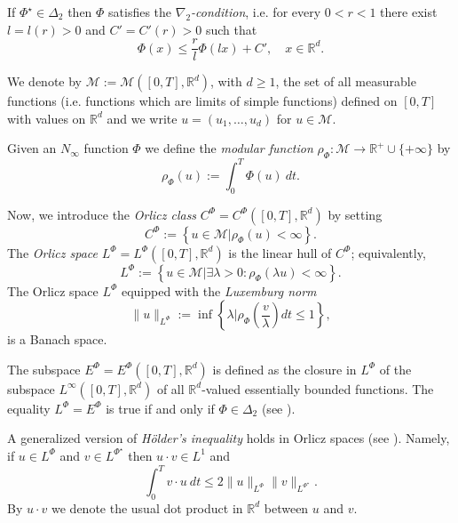 \documentclass[twoside]{article}
\theoremstyle{remark}
\newcommand{\orlnor}{\|_{L^{\Phi}}}
\newcommand{\lphi}{L^{\Phi}}
\newcommand{\lpsi}{L^{\Phi^{\star}}}
\newcommand{\ephi}{E^{\Phi}}
\newcommand{\claseor}{C^{\Phi}}
\newcommand{\rr}{\mathbb{R}}
\renewcommand{\leq}{\leqslant}
\renewcommand{\geq}{\geqslant}
\begin{document}
If $\Phi^{\star}\in\Delta_2$ then $\Phi$ satisfies the \emph{$\nabla_2$-condition}, i.e.  for every $0<r<1$ there exist $l=l(r)>0$ and $C'=C'(r)>0$ such that 
\begin{equation}\label{eq:nabla2}
  \Phi(x)\leq \frac{r}{l}\Phi(l x)+C',\quad x\in\rr^d.
\end{equation}





 We denote by $\mathcal{M}:=\mathcal{M}\left([0,T],\rr^d\right)$, with $d\geq 1$,  the set of all measurable functions (i.e. functions which are limits of simple functions)  defined on $[0,T]$ with values on $\mathbb{R}^d$ and  we write $u=(u_1,\dots,u_d)$ for  $u\in \mathcal{M}$.

 Given  an $N_{\infty}$ function $\Phi$ we define the \emph{modular function} 
$\rho_{\Phi}:\mathcal{M}\to \mathbb{R}^+\cup\{+\infty\}$ by
\[\rho_{\Phi}(u):= \int_0^T \Phi(u)\ dt.\]

Now, we introduce the \emph{Orlicz class} $C^{\Phi}=C^{\Phi}\left([0,T],\rr^d\right)$   by setting
\begin{equation}\label{claseOrlicz}
  C^{\Phi}:=\left\{u\in \mathcal{M} | \rho_{\Phi}(u)< \infty \right\}.
\end{equation}
The \emph{Orlicz space} $\lphi=L^{\Phi}\left([0,T],\rr^d\right)$ is the linear hull of $\claseor$;
equivalently,
\begin{equation}\label{espacioOrlicz}
\lphi:=\left\{ u\in \mathcal{M}| \exists \lambda>0: \rho_{\Phi}(\lambda u) < \infty   \right\}.
\end{equation}
  The Orlicz space $\lphi$ equipped with the \emph{Luxemburg norm}
\[
\|  u  \orlnor:=\inf \left\{ \lambda\bigg| \rho_{\Phi}\left(\frac{v}{\lambda}\right) dt\leq 1\right\},
\]
is a Banach space. 


The subspace $\ephi=\ephi\left([0,T],\rr^d\right)$ is defined as the closure in $\lphi$ of the subspace $L^{\infty}\left([0,T],\rr^d\right)$ of all $\mathbb{R}^d$-valued essentially bounded functions. The equality $\lphi=\ephi$ is true if and only if $\Phi\in\Delta_2$ (see \cite[Cor. 5.1]{Orliczvectorial2005}). 

A generalized version of \emph{H\"older's inequality} holds in Orlicz spaces (see \cite[Thm. 7.2]{Orliczvectorial2005}). Namely, if $u\in\lphi$ and $v\in\lpsi$ then $u\cdot v\in L^1$ and
\begin{equation}\label{holder}
\int_0^Tv\cdot u\ dt\leq 2 \|u\orlnor\|v\|_{L^{\Phi^{\star}}}.
\end{equation}
By $u\cdot v$ we denote the usual dot product in $\mathbb{R}^{d}$ between $u$ and $v$.
\end{document}
